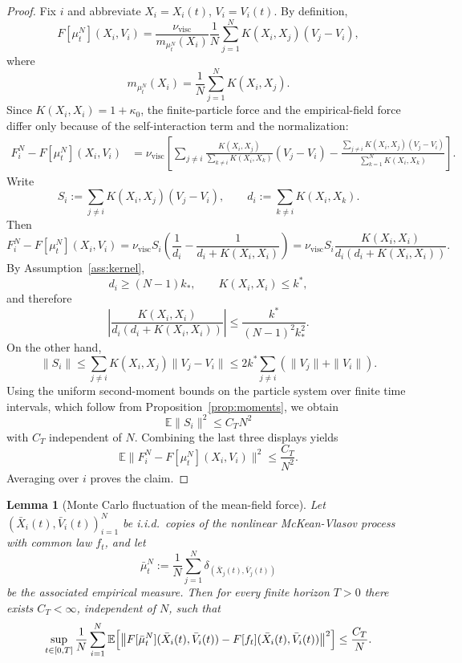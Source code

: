 \documentclass[11pt]{article}
\newtheorem{lemma}[theorem]{Lemma}
\theoremstyle{definition}
\theoremstyle{remark}
\newcommand{\E}{\mathbb{E}}
\begin{document}
\begin{proof}
Fix $i$ and abbreviate $X_i=X_i(t)$, $V_i=V_i(t)$. By definition,
\[
F[\mu_t^N](X_i,V_i)
=
\frac{\nu_{\mathrm{visc}}}{m_{\mu_t^N}(X_i)}
\frac1N\sum_{j=1}^N K(X_i,X_j)(V_j-V_i),
\]
where
\[
m_{\mu_t^N}(X_i)
=
\frac1N\sum_{j=1}^N K(X_i,X_j).
\]
Since $K(X_i,X_i)=1+\kappa_0$, the finite-particle force and the empirical-field
force differ only because of the self-interaction term and the normalization:
\begin{align*}
F_i^N-F[\mu_t^N](X_i,V_i)
&=
\nu_{\mathrm{visc}}
\left[
\sum_{j\neq i}\frac{K(X_i,X_j)}{\sum_{k\neq i}K(X_i,X_k)}(V_j-V_i)
-\frac{\sum_{j\neq i}K(X_i,X_j)(V_j-V_i)}{\sum_{k=1}^N K(X_i,X_k)}
\right].
\end{align*}
Write
\[
S_i:=\sum_{j\neq i}K(X_i,X_j)(V_j-V_i),
\qquad
d_i:=\sum_{k\neq i}K(X_i,X_k).
\]
Then
\[
F_i^N-F[\mu_t^N](X_i,V_i)
=
\nu_{\mathrm{visc}} S_i\left(\frac{1}{d_i}-\frac{1}{d_i+K(X_i,X_i)}\right)
=
\nu_{\mathrm{visc}} S_i\frac{K(X_i,X_i)}{d_i(d_i+K(X_i,X_i))}.
\]
By Assumption~\ref{ass:kernel},
\[
d_i\geq (N-1)k_*,
\qquad
K(X_i,X_i)\leq k^*,
\]
and therefore
\[
\left|\frac{K(X_i,X_i)}{d_i(d_i+K(X_i,X_i))}\right|
\leq
\frac{k^*}{(N-1)^2k_*^2}.
\]
On the other hand,
\[
\|S_i\|
\leq
\sum_{j\neq i}K(X_i,X_j)\|V_j-V_i\|
\leq
2k^*\sum_{j\neq i}(\|V_j\|+\|V_i\|).
\]
Using the uniform second-moment bounds on the particle system over finite time
intervals, which follow from Proposition~\ref{prop:moments},
we obtain
\[
\E\|S_i\|^2\leq C_T N^2
\]
with $C_T$ independent of $N$. Combining the last three displays yields
\[
\E\|F_i^N-F[\mu_t^N](X_i,V_i)\|^2
\leq
\frac{C_T}{N^2}.
\]
Averaging over $i$ proves the claim.
\end{proof}

\begin{lemma}[Monte Carlo fluctuation of the mean-field force]\label{lem:mc-force}
Let $(\bar X_i(t),\bar V_i(t))_{i=1}^N$ be i.i.d.\ copies of the nonlinear
McKean-Vlasov process with common law $f_t$, and let
\[
\bar\mu_t^N:=\frac1N\sum_{j=1}^N \delta_{(\bar X_j(t),\bar V_j(t))}
\]
be the associated empirical measure. Then for every finite horizon $T>0$ there
exists $C_T<\infty$, independent of $N$, such that
\[
\sup_{t\in[0,T]}
\frac1N\sum_{i=1}^N
\E\Bigl[
\bigl\|F[\bar\mu_t^N](\bar X_i(t),\bar V_i(t))
-F[f_t](\bar X_i(t),\bar V_i(t))\bigr\|^2
\Bigr]
\leq
\frac{C_T}{N}.
\]
\end{lemma}
\end{document}
